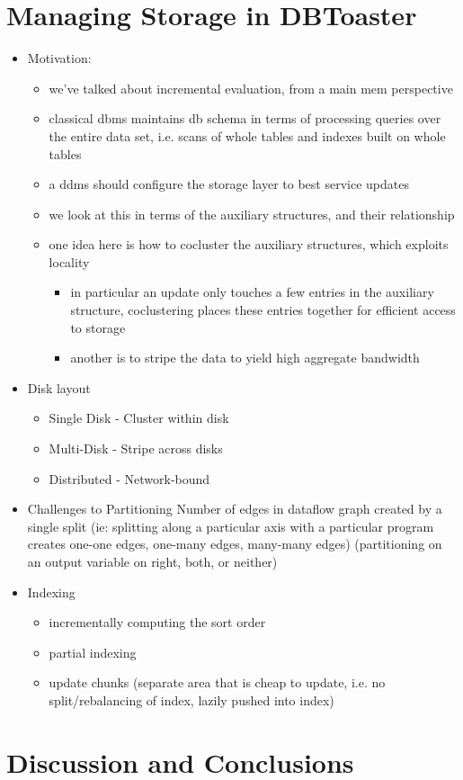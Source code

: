 \documentclass{sig-alternate}
\begin{document}
\section{Managing Storage in DBToaster}
\begin{itemize}
\item Motivation:
  \begin{itemize}
  \item we've talked about incremental evaluation, from a main mem perspective
  \item classical dbms maintains db schema in terms of processing queries over the entire data set, i.e. scans of whole tables and indexes built on whole tables
  \item a ddms should configure the storage layer to best service updates
  \item we look at this in terms of the auxiliary structures, and their relationship
  \item one idea here is how to cocluster the auxiliary structures, which exploits locality
    \begin{itemize}
    \item in particular an update only touches a few entries in the auxiliary structure, coclustering places these entries together for efficient access to storage
    \item another is to stripe the data to yield high aggregate bandwidth
    \end{itemize}
  \end{itemize}

\item Disk layout
  \begin{itemize}
  \item Single Disk - Cluster within disk
  \item Multi-Disk - Stripe across disks
  \item Distributed - Network-bound
  \end{itemize}

\item Challenges to Partitioning
Number of edges in dataflow graph created by a single split (ie: splitting along a particular axis with a particular program creates one-one edges, one-many edges, many-many edges) (partitioning on an output variable on right, both, or neither)

\item Indexing
  \begin{itemize}
  \item incrementally computing the sort order
  \item partial indexing
  \item update chunks (separate area that is cheap to update, i.e. no split/rebalancing of index, lazily pushed into index)
  \end{itemize}
\end{itemize}


\section{Discussion and Conclusions}
\end{document}
